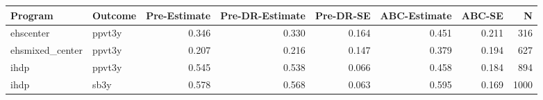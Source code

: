 \begin{table}[ht]
\centering
\begin{tabular}{llrrrrrr}
  \hline
Program & Outcome & Pre-Estimate & Pre-DR-Estimate & Pre-DR-SE & ABC-Estimate & ABC-SE & N \\ 
  \hline
ehscenter & ppvt3y & 0.346 & 0.330 & 0.164 & 0.451 & 0.211 & 316 \\ 
  ehsmixed\_center & ppvt3y & 0.207 & 0.216 & 0.147 & 0.379 & 0.194 & 627 \\ 
  ihdp & ppvt3y & 0.545 & 0.538 & 0.066 & 0.458 & 0.184 & 894 \\ 
  ihdp & sb3y & 0.578 & 0.568 & 0.063 & 0.595 & 0.169 & 1000 \\ 
   \hline
\end{tabular}
\end{table}
